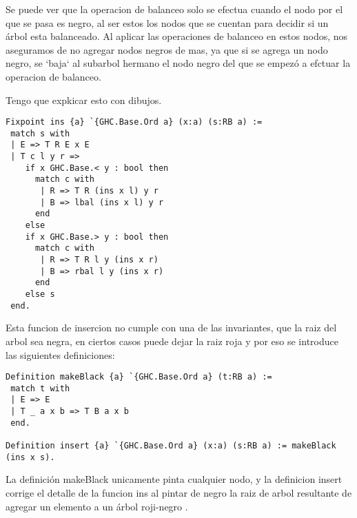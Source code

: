 \documentclass[letterpaper,12pt,oneside]{book}
\newcommand{\arn}{árbol roji-negro }
\begin{document}
Se puede ver que la operacion de balanceo solo se efectua cuando el nodo por el que se pasa es negro, al ser estos los nodos que se cuentan para decidir si un \'arbol
esta balanceado. Al aplicar las operaciones de balanceo en estos nodos, nos aseguramos de no agregar nodos negros de mas, ya que si se agrega un nodo negro, se `baja` al subarbol hermano
el nodo negro del que se empez\'o a efctuar la operacion de balanceo. 

Tengo que expkicar esto con dibujos.
\begin{verbatim}
Fixpoint ins {a} `{GHC.Base.Ord a} (x:a) (s:RB a) :=
 match s with
 | E => T R E x E
 | T c l y r =>
    if x GHC.Base.< y : bool then 
      match c with
       | R => T R (ins x l) y r
       | B => lbal (ins x l) y r
      end
    else 
    if x GHC.Base.> y : bool then 
      match c with
       | R => T R l y (ins x r)
       | B => rbal l y (ins x r)
      end
    else s
 end.
\end{verbatim}

Esta funcion de insercion no cumple con una de las invariantes, que la raiz del arbol sea negra, en ciertos casos puede dejar la raiz roja y por eso se introduce las siguientes definiciones:

\begin{verbatim}
Definition makeBlack {a} `{GHC.Base.Ord a} (t:RB a) :=
 match t with
 | E => E
 | T _ a x b => T B a x b
 end.

Definition insert {a} `{GHC.Base.Ord a} (x:a) (s:RB a) := makeBlack (ins x s).
\end{verbatim}

La definici\'on makeBlack unicamente pinta cualquier nodo, y la definicion insert corrige el detalle de la funcion ins al pintar de negro la raiz de arbol resultante de 
agregar un elemento a un \arn.
\end{document}

